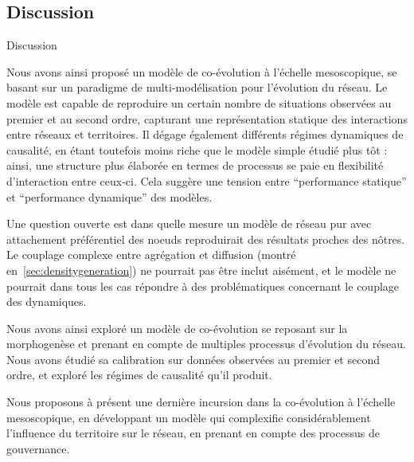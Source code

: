 \subsection{Discussion}{Discussion}


Nous avons ainsi proposé un modèle de co-évolution à l'échelle mesoscopique, se basant sur un paradigme de multi-modélisation pour l'évolution du réseau. Le modèle est capable de reproduire un certain nombre de situations observées au premier et au second ordre, capturant une représentation statique des interactions entre réseaux et territoires. Il dégage également différents régimes dynamiques de causalité, en étant toutefois moins riche que le modèle simple étudié plus tôt : ainsi, une structure plus élaborée en termes de processus se paie en flexibilité d'interaction entre ceux-ci. Cela suggère une tension entre ``performance statique'' et ``performance dynamique'' des modèles.


Une question ouverte est dans quelle mesure un modèle de réseau pur avec attachement préférentiel des noeuds reproduirait des résultats proches des nôtres. Le couplage complexe entre agrégation et diffusion (montré en~\ref{sec:densitygeneration}) ne pourrait pas être inclut aisément, et le modèle ne pourrait dans tous les cas répondre à des problématiques concernant le couplage des dynamiques.



\stars

Nous avons ainsi exploré un modèle de co-évolution se reposant sur la morphogenèse et prenant en compte de multiples processus d'évolution du réseau. Nous avons étudié sa calibration sur données observées au premier et second ordre, et exploré les régimes de causalité qu'il produit.


Nous proposons à présent une dernière incursion dans la co-évolution à l'échelle mesoscopique, en développant un modèle qui complexifie considérablement l'influence du territoire sur le réseau, en prenant en compte des processus de gouvernance. 


\stars






